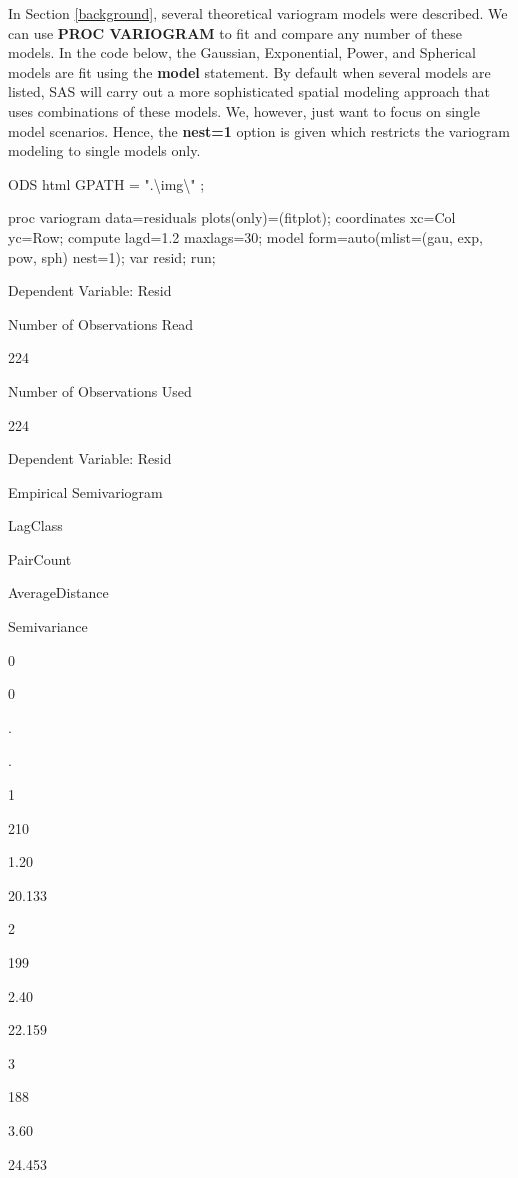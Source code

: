 \documentclass[
]{book}
\newenvironment{Shaded}{\begin{snugshade}}{\end{snugshade}}
\newcommand{\NormalTok}[1]{#1}
\begin{document}
In Section \ref{background}, several theoretical variogram models were described. We can use \textbf{PROC VARIOGRAM} to fit and compare any number of these models. In the code below, the Gaussian, Exponential, Power, and Spherical models are fit using the \textbf{model} statement. By default when several models are listed, SAS will carry out a more sophisticated spatial modeling approach that uses combinations of these models. We, however, just want to focus on single model scenarios. Hence, the \textbf{nest=1} option is given which restricts the variogram modeling to single models only.

\begin{Shaded}
\begin{Highlighting}[]
\NormalTok{ODS html GPATH = ".\textbackslash{}img\textbackslash{}" ;}

\NormalTok{proc variogram data=residuals plots(only)=(fitplot);}
\NormalTok{   coordinates xc=Col yc=Row;}
\NormalTok{   compute lagd=1.2 maxlags=30;}
\NormalTok{   model form=auto(mlist=(gau, exp, pow, sph) nest=1);}
\NormalTok{  var resid;}
\NormalTok{run;}
\end{Highlighting}
\end{Shaded}

Dependent Variable: Resid

Number of Observations Read

224

Number of Observations Used

224

Dependent Variable: Resid

Empirical Semivariogram

LagClass

PairCount

AverageDistance

Semivariance

0

0

.

.

1

210

1.20

20.133

2

199

2.40

22.159

3

188

3.60

24.453
\end{document}
